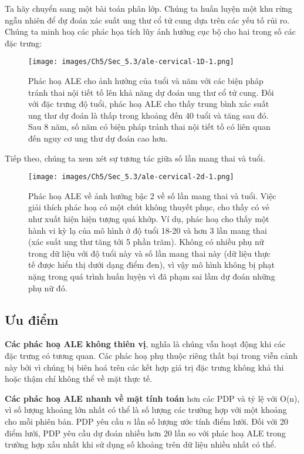 Ta hãy chuyển sang một bài toán phân lớp. Chúng ta huấn luyện một khu rừng ngẫu nhiên để dự đoán xác suất ung thư cổ tử cung dựa trên các yếu tố rủi ro. Chúng ta minh hoạ các phác họa tích lũy ảnh hưởng cục bộ cho hai trong số các đặc trưng:

\begin{figure*}[h!]
	\centering
	\texttt{[image: images/Ch5/Sec\_5.3/ale-cervical-1D-1.png]}
	\label{fig:5_22}
	\caption{Phác hoạ ALE cho ảnh hưởng của tuổi và năm với các biện pháp tránh thai nội tiết tố lên khả năng dự đoán ung thư cổ tử cung. Đối với đặc trưng độ tuổi, phác hoạ ALE cho thấy trung bình xác suất ung thư dự đoán là thấp trong khoảng đến 40 tuổi và tăng sau đó. Sau 8 năm, số năm có biện pháp tránh thai nội tiết tố có liên quan đến nguy cơ ung thư dự đoán cao hơn.}
\end{figure*}
Tiếp theo, chúng ta xem xét sự tương tác giữa số lần mang thai và tuổi.

\begin{figure*}[h!]
	\centering
	\texttt{[image: images/Ch5/Sec\_5.3/ale-cervical-2d-1.png]}
	\label{fig:5_23}
	\caption{Phác hoạ ALE về ảnh hưởng bậc 2 về số lần mang thai và tuổi. Việc giải thích phác hoạ có một chút không thuyết phục, cho thấy có vẻ như xuất hiện hiện tượng quá khớp. Ví dụ, phác hoạ cho thấy một hành vi kỳ lạ của mô hình ở độ tuổi 18-20 và hơn 3 lần mang thai (xác suất ung thư tăng tới 5 phần trăm). Không có nhiều phụ nữ trong dữ liệu với độ tuổi này và số lần mang thai này (dữ liệu thực tế được hiển thị dưới dạng điểm đen), vì vậy mô hình không bị phạt nặng trong quá trình huấn luyện vì đã phạm sai lầm dự đoán những phụ nữ đó.}
\end{figure*}

\subsection{Ưu điểm}
\textbf{Các phác hoạ ALE không thiên vị}, nghĩa là chúng vẫn hoạt động khi các đặc trưng có tương quan. Các phác hoạ phụ thuộc riêng thất bại trong viễn cảnh này bởi vì chúng bị biên hoá trên các kết hợp giá trị đặc trưng không khả thi hoặc thậm chí không thể về mặt thực tế.

\textbf{Các phác hoạ ALE nhanh về mặt tính toán} hơn các PDP và tỷ lệ với O(n), vì số lượng khoảng lớn nhất có thể là số lượng các trường hợp với một khoảng cho mỗi phiên bản. PDP yêu cầu $n$ lần số lượng ước tính điểm lưới. Đối với 20 điểm lưới, PDP yêu cầu dự đoán nhiều hơn 20 lần so với phác hoạ ALE trong trường hợp xấu nhất khi sử dụng số khoảng trên dữ liệu nhiều nhất có thể.

